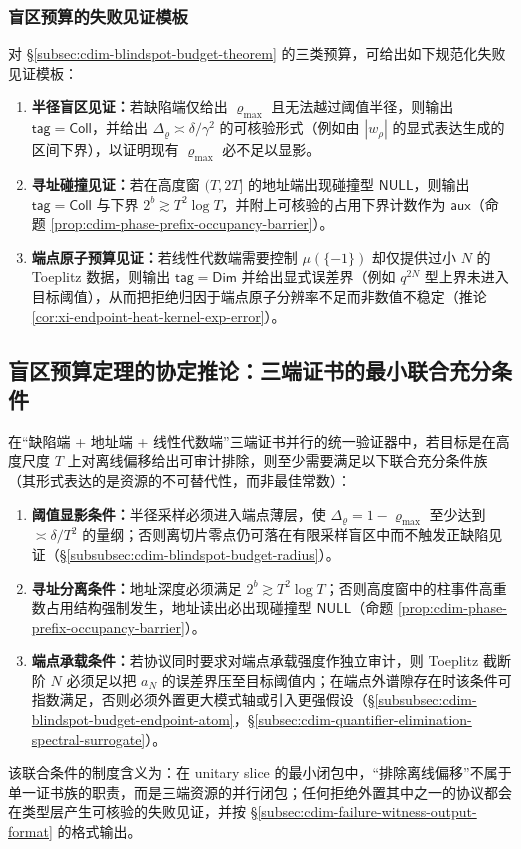 \subsubsection{盲区预算的失败见证模板}\label{subsubsec:cdim-failure-witness-templates}
对 \S\ref{subsec:cdim-blindspot-budget-theorem} 的三类预算，可给出如下规范化失败见证模板：
\begin{enumerate}
  \item \textbf{半径盲区见证：}若缺陷端仅给出 \(\varrho_{\max}\) 且无法越过阈值半径，则输出 \(\mathsf{tag}=\mathsf{Coll}\)，并给出 \(\Delta_{\varrho}\asymp \delta/\gamma^2\) 的可核验形式（例如由 \(|w_\rho|\) 的显式表达生成的区间下界），以证明现有 \(\varrho_{\max}\) 必不足以显影。
  \item \textbf{寻址碰撞见证：}若在高度窗 \((T,2T]\) 的地址端出现碰撞型 \(\mathsf{NULL}\)，则输出 \(\mathsf{tag}=\mathsf{Coll}\) 与下界 \(2^b\gtrsim T^2\log T\)，并附上可核验的占用下界计数作为 \(\mathsf{aux}\)（命题 \ref{prop:cdim-phase-prefix-occupancy-barrier}）。
  \item \textbf{端点原子预算见证：}若线性代数端需要控制 \(\mu(\{-1\})\) 却仅提供过小 \(N\) 的 Toeplitz 数据，则输出 \(\mathsf{tag}=\mathsf{Dim}\) 并给出显式误差界（例如 \(q^{2N}\) 型上界未进入目标阈值），从而把拒绝归因于端点原子分辨率不足而非数值不稳定（推论 \ref{cor:xi-endpoint-heat-kernel-exp-error}）。
\end{enumerate}

\subsection{盲区预算定理的协定推论：三端证书的最小联合充分条件}\label{subsec:cdim-blindspot-budget-corollaries}
在“缺陷端 + 地址端 + 线性代数端”三端证书并行的统一验证器中，若目标是在高度尺度 \(T\) 上对离线偏移给出可审计排除，则至少需要满足以下联合充分条件族（其形式表达的是资源的不可替代性，而非最佳常数）：
\begin{enumerate}
  \item \textbf{阈值显影条件：}半径采样必须进入端点薄层，使 \(\Delta_{\varrho}=1-\varrho_{\max}\) 至少达到 \(\asymp \delta/T^2\) 的量纲；否则离切片零点仍可落在有限采样盲区中而不触发正缺陷见证（\S\ref{subsubsec:cdim-blindspot-budget-radius}）。
  \item \textbf{寻址分离条件：}地址深度必须满足 \(2^b\gtrsim T^2\log T\)；否则高度窗中的柱事件高重数占用结构强制发生，地址读出必出现碰撞型 \(\mathsf{NULL}\)（命题 \ref{prop:cdim-phase-prefix-occupancy-barrier}）。
  \item \textbf{端点承载条件：}若协议同时要求对端点承载强度作独立审计，则 Toeplitz 截断阶 \(N\) 必须足以把 \(a_N\) 的误差界压至目标阈值内；在端点外谱隙存在时该条件可指数满足，否则必须外置更大模式轴或引入更强假设（\S\ref{subsubsec:cdim-blindspot-budget-endpoint-atom}，\S\ref{subsec:cdim-quantifier-elimination-spectral-surrogate}）。
\end{enumerate}
该联合条件的制度含义为：在 unitary slice 的最小闭包中，“排除离线偏移”不属于单一证书族的职责，而是三端资源的并行闭包；任何拒绝外置其中之一的协议都会在类型层产生可核验的失败见证，并按 \S\ref{subsec:cdim-failure-witness-output-format} 的格式输出。

\endinput

